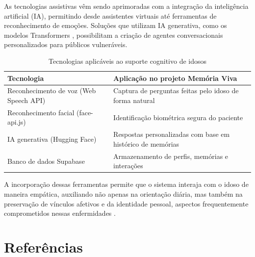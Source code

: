 \documentclass[12pt]{article}
\begin{document}
As tecnologias assistivas vêm sendo aprimoradas com a integração da inteligência artificial (IA), permitindo desde assistentes virtuais até ferramentas de reconhecimento de emoções. Soluções que utilizam IA generativa, como os modelos Transformers \cite{huggingface2023}, possibilitam a criação de agentes conversacionais personalizados para públicos vulneráveis.

\begin{table}[h]
\centering
\caption{Tecnologias aplicáveis ao suporte cognitivo de idosos}
\label{tab:tecnologias}
\begin{tabular}{|p{4cm}|p{7cm}|}
\hline
\textbf{Tecnologia} & \textbf{Aplicação no projeto Memória Viva} \\ \hline
Reconhecimento de voz (Web Speech API) & Captura de perguntas feitas pelo idoso de forma natural \\ \hline
Reconhecimento facial (face-api.js) & Identificação biométrica segura do paciente \\ \hline
IA generativa (Hugging Face) & Respostas personalizadas com base em histórico de memórias \\ \hline
Banco de dados Supabase & Armazenamento de perfis, memórias e interações \\ \hline
\end{tabular}
\end{table}

A incorporação dessas ferramentas permite que o sistema interaja com o idoso de maneira empática, auxiliando não apenas na orientação diária, mas também na preservação de vínculos afetivos e da identidade pessoal, aspectos frequentemente comprometidos nessas enfermidades \cite{assistiva2024}.



\section*{Referências}
\end{document}
